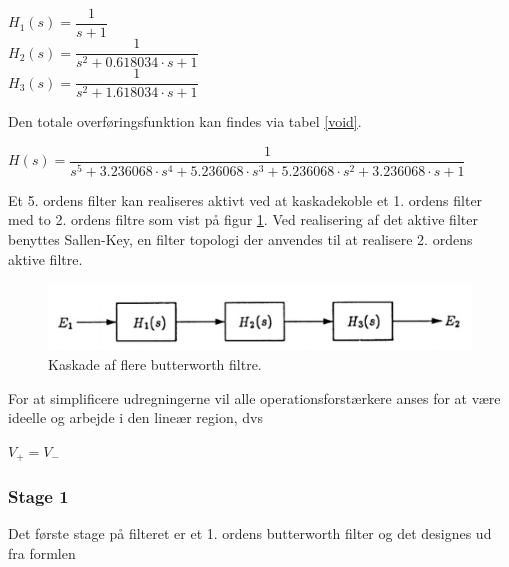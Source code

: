 \begin{center}
 $H_1(s) = \dfrac{1}{s+1}$\\
 \vspace{4mm} 
 $H_2(s) = \dfrac{1}{s^2 + 0.618034\cdot s + 1}$\\
 \vspace{4mm}
 $H_3(s) = \dfrac{1}{s^2 + 1.618034\cdot s + 1}$\\
\end{center}

Den totale overføringsfunktion kan findes via tabel \ref{void}.\\ 
\begin{center}
 $H(s) = \dfrac{1}{s^5+3.236068\cdot s^4 + 5.236068\cdot s^3 + 5.236068\cdot s^2 + 3.236068\cdot s +1}$
\end{center}
Et 5. ordens filter kan realiseres aktivt ved at kaskadekoble et 1. ordens filter med to 2. ordens filtre som vist på figur  \ref{fig::anfilter_kask_butterworth}. Ved realisering af det aktive filter benyttes Sallen-Key, en filter topologi der anvendes til at realisere 2. ordens aktive filtre. 

\begin{figure}[h!]
	\centering
	\includegraphics[scale=0.7]{./billeder/Kaskade}
	\caption{Kaskade af flere butterworth filtre.}
	\label{fig::anfilter_kask_butterworth}
\end{figure}
\FloatBlock

For at simplificere udregningerne vil alle operationsforstærkere anses for at være ideelle og arbejde i den lineær region, dvs\\

\begin{center}
	$V_+ = V_-$
\end{center}

\subsubsection{Stage 1} 
Det første stage på filteret er et 1. ordens butterworth filter og det designes ud fra formlen\\

